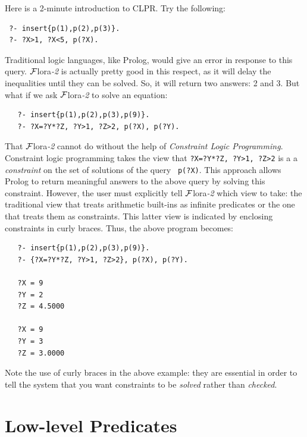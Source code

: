 \documentclass[11pt]{article}
\newcommand{\FLORA}{{\mbox{\sc ${\cal F}${lora}\rm\emph{-2}}}\xspace}
\newcommand{\FLSYSTEM}{\FLORA}
\begin{document}
Here is a 2-minute introduction to CLPR. Try the following:
\begin{verbatim}
 ?- insert{p(1),p(2),p(3)}.
 ?- ?X>1, ?X<5, p(?X).
\end{verbatim}
Traditional logic languages, like Prolog, would give an error
in response to this query. \FLSYSTEM is actually pretty good in this respect,
as it will delay the inequalities until they can be solved. So, it will
return two answers: 2 and 3. But what if we ask \FLSYSTEM to solve an equation:
\begin{verbatim}
   ?- insert{p(1),p(2),p(3),p(9)}.
   ?- ?X=?Y*?Z, ?Y>1, ?Z>2, p(?X), p(?Y).
\end{verbatim}
That \FLSYSTEM cannot do without the help of 
\emph{Constraint Logic Programming}.
Constraint logic programming takes the view that
\texttt{?X=?Y*?Z, ?Y>1, ?Z>2} is a  
a \emph{constraint} on the set of solutions of the query {\tt
  p(?X)}. This approach allows Prolog to return meaningful answers to the
above query by solving this constraint.
However, the user must explicitly tell \FLSYSTEM which view
  to take: the traditional view that treats arithmetic built-ins as
  infinite predicates or the one that treats them as constraints.
  This latter view is indicated by enclosing constraints in curly
  braces. Thus, the above program becomes:
\begin{verbatim}
   ?- insert{p(1),p(2),p(3),p(9)}.
   ?- {?X=?Y*?Z, ?Y>1, ?Z>2}, p(?X), p(?Y).
  
   ?X = 9
   ?Y = 2
   ?Z = 4.5000

   ?X = 9
   ?Y = 3
   ?Z = 3.0000
\end{verbatim}
  Note the use of curly braces in the above example: they are essential in
  order to tell the system that you want constraints to be \emph{solved}
  rather than \emph{checked}.  

\section{Low-level Predicates}
\label{sec-lowlevel}
\end{document}
